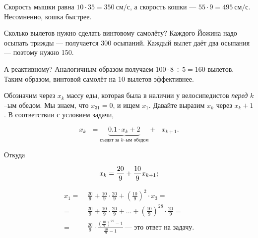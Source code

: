 \begin{itemize}
\itA Скорость мышки равна $10 \cdot 35 = \SI{350}{\text{см}/\text{с}}$, а скорость кошки — $55 \cdot 9 = \SI{495}{\text{см}/\text{с}}$. Несомненно, кошка быстрее.

\itB Сколько вылетов нужно сделать винтовому самолёту? Каждого Йожина надо осыпать трижды — получается 300 осыпаний. Каждый вылет даёт два осыпания — поэтому нужно 150.

\ms А реактивному? Аналогичным образом получаем $100 \cdot 8 \div 5 = 160$ вылетов. Таким образом, винтовой самолёт на 10 вылетов эффективнее.

\itC Обозначим через $x_k$ массу еды, которая была в наличии у велосипедистов {\itshape перед} $k$--ым обедом. Мы знаем, что $x_{31}=0$, и ищем $x_1$. Давайте выразим $x_k$ через $x_k+1$. В соответствии с условием задачи,

$$x_k\ \ \ = \underbrace{0.1 \cdot x_k + 2}_{\text{съедят за $k$--ым обедом}} +\ \ \ x_{k+1}.$$

Откуда

$$x_k = \frac{20}{9} + \frac{10}{9} x_{k+1}\scolon$$

\begin{align*}
x_1 =\ & \frac{20}{9} + \frac{10}{9} \cdot \frac{20}{9} + \left(\frac{10}{9}\right)^2 \cdot x_3 = \\
=\ & \frac{20}{9} + \frac{10}{9} \cdot \frac{20}{9} + \ldots + \left(\frac{10}{9}\right)^{28}
	\cdot\frac{20}{9} = \\
=\ & \frac{20}{9} \cdot \frac{\left(\tfrac{10}{9}\right)^{29}-1}{\tfrac{10}{9}-1}
	\ \text{— это ответ на задачу.}
\end{align*}

\end{itemize}